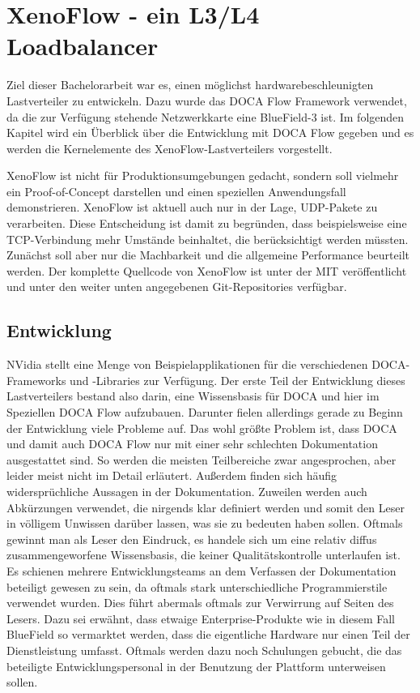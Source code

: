 \chapter{XenoFlow - ein L3/L4 Loadbalancer}
\label{cha:implementation}
Ziel dieser Bachelorarbeit war es, einen möglichst hardwarebeschleunigten Lastverteiler zu entwickeln. Dazu wurde das DOCA Flow Framework verwendet, da die zur Verfügung stehende Netzwerkkarte eine BlueField-3 ist. Im folgenden Kapitel wird ein Überblick über die Entwicklung mit DOCA Flow gegeben und es werden die Kernelemente des XenoFlow-Lastverteilers vorgestellt. 

XenoFlow ist nicht für Produktionsumgebungen gedacht, sondern soll vielmehr ein Proof-of-Concept darstellen und einen speziellen Anwendungsfall demonstrieren. XenoFlow ist aktuell auch nur in der Lage, UDP-Pakete zu verarbeiten. Diese Entscheidung ist damit zu begründen, dass beispielsweise eine TCP-Verbindung mehr Umstände beinhaltet, die berücksichtigt werden müssten. Zunächst soll aber nur die Machbarkeit und die allgemeine Performance beurteilt werden. Der komplette Quellcode von XenoFlow ist unter der MIT veröffentlicht und unter den weiter unten angegebenen Git-Repositories verfügbar.
\section{Entwicklung}
NVidia stellt eine Menge von Beispielapplikationen für die verschiedenen DOCA-Frameworks und -Libraries zur Verfügung. Der erste Teil der Entwicklung dieses Lastverteilers bestand also darin, eine Wissensbasis für DOCA und hier im Speziellen DOCA Flow aufzubauen. Darunter fielen allerdings gerade zu Beginn der Entwicklung viele Probleme auf. Das wohl größte Problem ist, dass DOCA und damit auch DOCA Flow nur mit einer sehr schlechten Dokumentation ausgestattet sind. So werden die meisten Teilbereiche zwar angesprochen, aber leider meist nicht im Detail erläutert. Außerdem finden sich häufig widersprüchliche Aussagen in der Dokumentation. Zuweilen werden auch Abkürzungen verwendet, die nirgends klar definiert werden und somit den Leser in völligem Unwissen darüber lassen, was sie zu bedeuten haben sollen. Oftmals gewinnt man als Leser den Eindruck, es handele sich um eine relativ diffus zusammengeworfene Wissensbasis, die keiner Qualitätskontrolle unterlaufen ist. Es schienen mehrere Entwicklungsteams an dem Verfassen der Dokumentation beteiligt gewesen zu sein, da oftmals stark unterschiedliche Programmierstile verwendet wurden. Dies führt abermals oftmals zur Verwirrung auf Seiten des Lesers. Dazu sei erwähnt, dass etwaige Enterprise-Produkte wie in diesem Fall BlueField so vermarktet werden, dass die eigentliche Hardware nur einen Teil der Dienstleistung umfasst. Oftmals werden dazu noch Schulungen gebucht, die das beteiligte Entwicklungspersonal in der Benutzung der Plattform unterweisen sollen. 

